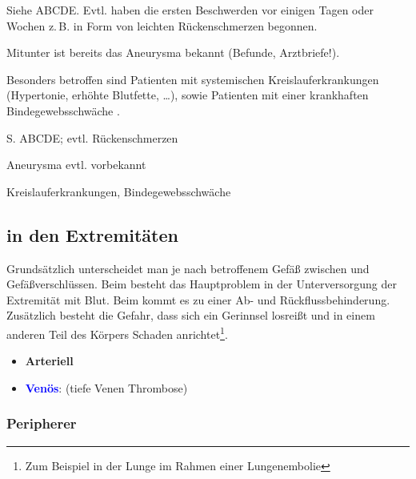 \TextSlide
{{\TxSAMPLER}}
{
\begin{SAMPLERText}
  \item[\SAMPLER{S}] Siehe ABCDE. Evtl. haben die ersten
  Beschwerden vor einigen Tagen oder Wochen z.\,B. in Form
  von leichten Rückenschmerzen begonnen. 
  \item[\SAMPLER{P}] Mitunter ist bereits das Aneurysma
  bekannt (Befunde, Arztbriefe!).
  \item[\SAMPLER{R}] Besonders betroffen sind Patienten mit
  systemischen Kreislauferkrankungen (Hypertonie, erhöhte
  Blutfette, \ldots), sowie Patienten mit einer krankhaften
  Bindegewebsschwäche .
\end{SAMPLERText}
}
{
\begin{SAMPLERSlide}
  \item[\SAMPLER{S}] S. ABCDE; evtl. Rückenschmerzen
  \item[\SAMPLER{P}] Aneurysma evtl. vorbekannt 
  \item[\SAMPLER{R}] Kreislauferkrankungen,
  Bindegewebsschwäche
\end{SAMPLERSlide}
}
{}
{}
{}



\bigskip

\subsection{ in den Extremitäten}
\label{topic:gefaessverschluesse-extremitaeten}

{%
Grundsätzlich unterscheidet man je nach betroffenem Gefäß
zwischen  und 
Gefäßverschlüssen. 
Beim  besteht
das Hauptproblem in der Unterversorgung der Extremität mit
Blut. Beim  kommt es zu einer Ab- und
Rückflussbehinderung. Zusätzlich besteht die Gefahr, dass sich
ein Gerinnsel losreißt und in einem anderen Teil des
Körpers Schaden anrichtet\footnote{Zum Beispiel in der
Lunge im Rahmen einer Lungenembolie}.
}{
\begin{itemize}
  \item \textbf{\textcolor[rgb]{0.7882353,0.0,0.08627451}{Arteriell}}
  \item \textbf{\textcolor{blue}{Venös}}:
   (tiefe Venen Thrombose)
\end{itemize}
}{}{}{}



\subsubsection{Peripherer }
\label{topic:arterieller-gefaessverschluss}

